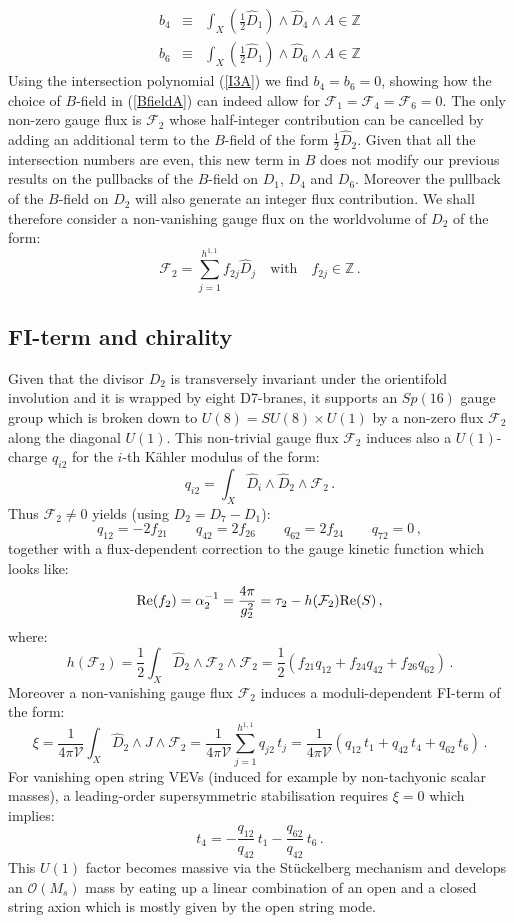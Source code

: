 \documentclass[11pt,a4paper]{article}
\newcommand{\bea}{\begin{eqnarray}}
\newcommand{\eea}{\end{eqnarray}}
\newcommand{\be}{\begin{equation}}
\newcommand{\ee}{\end{equation}}
\newcommand{\F}{\mathcal{F}}
\def\nn{\nonumber}
\newcommand\vo{{\mathcal{V}}}
\newcommand{\mc}{\mathcal}
\begin{document}
\bea
b_4 &\equiv& \int_X \left(\frac12 \hat{D}_1 \right) \wedge \hat{D}_4 \wedge A \in \mathbb{Z} \nn \\
b_6 &\equiv& \int_X \left(\frac12 \hat{D}_1 \right) \wedge \hat{D}_6 \wedge A \in \mathbb{Z} \nn
\eea
Using the intersection polynomial (\ref{I3A}) we find $b_4 = b_6 = 0$, showing how the choice of $B$-field in (\ref{BfieldA}) can indeed allow for $\F_1=\F_4=\F_6=0$. The only non-zero gauge flux is $\F_2$ whose half-integer contribution can be cancelled by adding an additional term to the $B$-field of the form $\frac12 \hat{D}_2$. Given that all the intersection numbers are even, this new term in $B$ does not modify our previous results on the pullbacks of the $B$-field on $D_1$, $D_4$ and $D_6$. Moreover the pullback of the $B$-field on $D_2$ will also generate an integer flux contribution. We shall therefore consider a non-vanishing gauge flux on the worldvolume of $D_2$ of the form:
\be
\F_2 = \sum_{j=1}^{h^{1,1}} f_{2j}\hat{D}_j \quad\text{with}\quad f_{2j}\in \mathbb{Z}\,.
\ee

\subsection{FI-term and chirality}

Given that the divisor $D_2$ is transversely invariant under the orientifold involution and it is wrapped by eight D7-branes, it supports an $Sp(16)$ gauge group which is broken down to $U(8)=SU(8)\times U(1)$ by a non-zero flux $\F_2$ along the diagonal $U(1)$. This non-trivial gauge flux $\F_2$ induces also a $U(1)$-charge $q_{i2}$ for the $i$-th K\"ahler modulus of the form:
\be
q_{i2} = \int_X \hat{D}_i \wedge \hat{D}_2 \wedge \F_2 \,.
\ee
Thus $\F_2\neq 0$ yields (using $D_2=D_7-D_1$):
\be
q_{12} =  - 2  f_{21} \qquad q_{42} =  2  f_{26} \qquad q_{62} =  2  f_{24} \qquad q_{72} = 0\,,
\ee
together with a flux-dependent correction to the gauge kinetic function which looks like:
\be
{\rm Re}(f_2)  = \alpha_2^{-1}=\frac{4\pi}{g_2^2}=\tau_2-h(\F_2) {\rm Re}(S)\,,
\ee
where: 
\be
h(\F_2) =\frac12 \int_X \hat{D}_2 \wedge \F_2 \wedge \F_2 =\frac12\left(f_{21} q_{12} + f_{24} q_{42} + f_{26} q_{62}\right)\,.
\ee
Moreover a non-vanishing gauge flux $\F_2$ induces a moduli-dependent FI-term of the form:
\be
\xi =\frac{1}{4\pi\vo}\int_X \hat{D}_2\wedge J\wedge\F_2=\frac{1}{4\pi\vo}\sum_{j=1}^{h^{1,1}} q_{j2}\,t_j
=\frac{1}{4\pi\vo} \left(q_{12}\,t_1+q_{42}\,t_4+q_{62}\,t_6\right)\,.
\ee
For vanishing open string VEVs (induced for example by non-tachyonic scalar masses), a leading-order supersymmetric stabilisation requires $\xi=0$ which implies:
\be
t_4 = - \frac{q_{12}}{q_{42}}\,t_1- \frac{q_{62}}{q_{42}}\,t_6\,.
\label{DfixA}
\ee
This $U(1)$ factor becomes massive via the St\"uckelberg mechanism and develops an $\mc{O}(M_s)$ mass by eating up a linear combination of an open and a closed string axion which is mostly given by the open string mode. 
\end{document}
